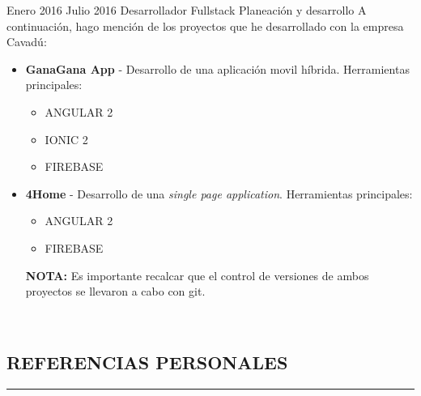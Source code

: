 \documentclass[letterpaper]{twentysecondcv} %
\begin{document}
\begin{twenty} %
\twentyitem
    	{Enero 2016}
		{Julio 2016}
        {Desarrollador Fullstack}
        {Planeación y desarrollo}
        {A continuación, hago mención de los proyectos que he desarrollado con la empresa Cavadú:}
        {\begin{itemize}
        \item {
        	\textbf{GanaGana App} - Desarrollo de una aplicación movil híbrida. Herramientas principales: 
        	\begin{itemize}
        		\item ANGULAR 2
        		\item IONIC 2
        		\item FIREBASE
        	\end{itemize}
        } 
        \item {
        	\textbf{4Home} - Desarrollo de una \textit{single page application}. Herramientas principales: 
        	\begin{itemize}
        		\item ANGULAR 2
        		\item FIREBASE
        	\end{itemize}
        } \begin{flushleft}
\vspace{.5cm}
\textbf{NOTA:} Es importante recalcar que el control de versiones de ambos proyectos se llevaron a cabo con git.
\end{flushleft}
        \end{itemize}}

        \\
        
\end{twenty}
\vspace{.5cm}

\newpage
\makesidebarcommon %
\begin{center}
\section{REFERENCIAS PERSONALES}
\end{center}
\noindent\rule{1\textwidth}{1.4pt}
\end{document}
